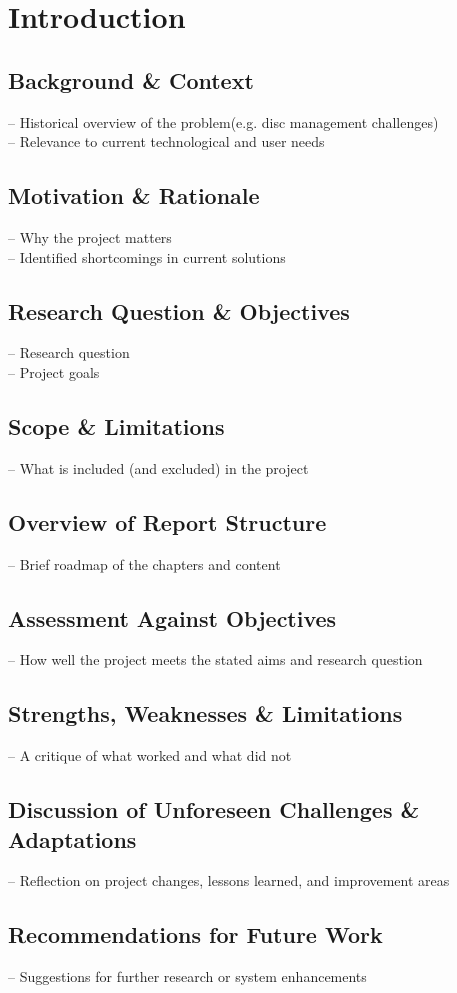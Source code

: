 \section{Introduction}

\subsection{Background \& Context}
– Historical overview of the problem(e.g. disc management challenges)\\
– Relevance to current technological and user needs
\subsection{Motivation \& Rationale}
– Why the project matters\\
– Identified shortcomings in current solutions
\subsection{Research Question \& Objectives}
– Research question \\
– Project goals
\subsection{Scope \& Limitations}
– What is included (and excluded) in the project \\
\subsection{Overview of Report Structure}
– Brief roadmap of the chapters and content
\subsection{Assessment Against Objectives}
– How well the project meets the stated aims and research question
\subsection{Strengths, Weaknesses \& Limitations}
– A critique of what worked and what did not
\subsection{Discussion of Unforeseen Challenges \& Adaptations}
– Reflection on project changes, lessons learned, and improvement areas
\subsection{Recommendations for Future Work}
– Suggestions for further research or system enhancements